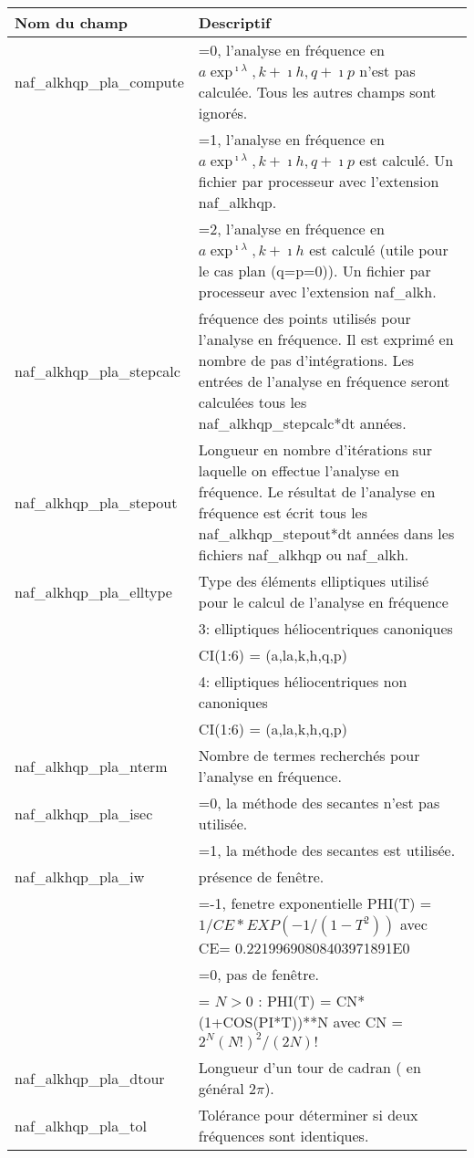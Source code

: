 \documentclass[11pt]{article}
\begin{document}
\begin{tabularx}{\textwidth}{|l|X|}
\hline
Nom du champ& Descriptif \\ \hline \hline
naf\_alkhqp\_pla\_compute &  =0, l'analyse en fr\'equence en $a\exp^{\imath\lambda}, k+\imath h, q+\imath p$ n'est pas calcul\'ee. Tous les autres champs sont ignor\'es.\\
&=1, l'analyse en fr\'equence en $a\exp^{\imath\lambda}, k+\imath h, q+\imath p$ est calcul\'e. Un fichier par processeur avec l'extension naf\_alkhqp.\\ 
&=2, l'analyse en fr\'equence en $a\exp^{\imath\lambda}, k+\imath h$ est calcul\'e (utile pour le cas  plan (q=p=0)). Un fichier par processeur avec l'extension naf\_alkh.\\ \hline

naf\_alkhqp\_pla\_stepcalc  & fr\'equence des points utilis\'es pour l'analyse en fr\'equence. Il est exprim\'e en nombre de pas d'int\'egrations. Les entr\'ees de l'analyse en fr\'equence seront calcul\'ees tous les naf\_alkhqp\_stepcalc*dt ann\'ees. \\ \hline

naf\_alkhqp\_pla\_stepout  & Longueur en nombre d'it\'erations sur laquelle on effectue l'analyse en fr\'equence. Le r\'esultat de l'analyse en fr\'equence est \'ecrit tous les naf\_alkhqp\_stepout*dt ann\'ees dans les fichiers naf\_alkhqp ou naf\_alkh.\\ \hline

naf\_alkhqp\_pla\_elltype  & Type des \'el\'ements elliptiques utilis\'e pour le calcul de l'analyse en fr\'equence\\ 
&3:  elliptiques h\'eliocentriques canoniques\\
&	     CI(1:6) = (a,la,k,h,q,p)\\
&4:  elliptiques h\'eliocentriques non canoniques\\
&	     CI(1:6) = (a,la,k,h,q,p)\\ \hline
naf\_alkhqp\_pla\_nterm  & Nombre de termes recherch\'es pour l'analyse en fr\'equence.\\ \hline
naf\_alkhqp\_pla\_isec  & =0, la m\'ethode des secantes n'est pas utilis\'ee.\\
&=1, la m\'ethode des secantes est utilis\'ee.\\ \hline
naf\_alkhqp\_pla\_iw  & pr\'esence de fen\^etre.\\
&=-1, fenetre exponentielle PHI(T) = $1/CE*EXP(-1/(1-T^2))$ avec CE= 0.22199690808403971891E0\\
&=0, pas de fen\^etre.\\
&= $N>0$ : PHI(T) = CN*(1+COS(PI*T))**N avec CN = $2^N(N!)^2/(2N)!$\\ \hline
naf\_alkhqp\_pla\_dtour  & Longueur d'un tour de cadran ( en g\'en\'eral $2\pi$).\\ \hline
naf\_alkhqp\_pla\_tol  &  Tol\'erance pour d\'eterminer si deux fr\'equences sont identiques.\\ \hline

 \end{tabularx}
\end{document}
